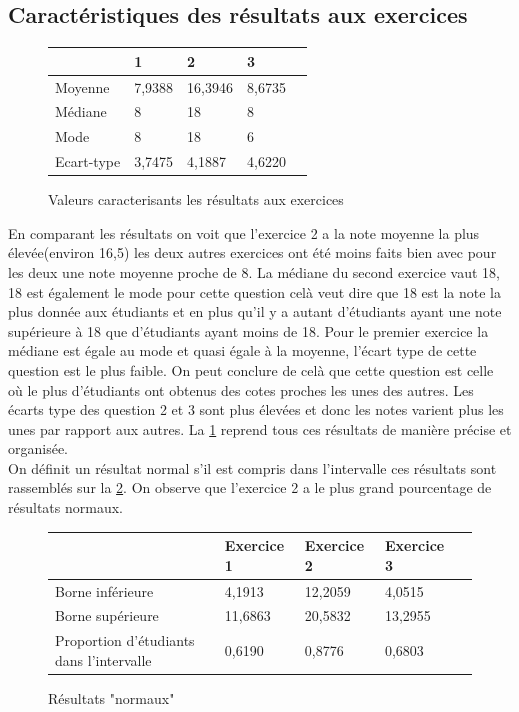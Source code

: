 \documentclass[a4paper, 11pt]{article}
\begin{document}
 	\subsection{Caractéristiques des résultats aux exercices}
 	\begin{figure}[H]
 	\begin{center}
   			\begin{tabular}{|l|l|l|l|l|}
				\hline
				 \backslashbox{Valeurs}{Question} & 1 & 2 & 3 \\
				\hline
				Moyenne & 7,9388  &  16,3946  &  8,6735  \\
  				Médiane & 8  &  18  &  8  \\
  				Mode & 8  &  18  &  6  \\
   				Ecart-type & 3,7475  &  4,1887  &  4,6220  \\
				\hline
			\end{tabular}
			\caption{Valeurs caracterisants les résultats aux exercices} \label{Q1B}
		\end{center}
		\end{figure}
En comparant les résultats on voit que l'exercice 2 a la note moyenne la plus élevée(environ 16,5) les deux autres exercices ont été  moins faits bien avec pour les deux une note moyenne proche de 8. La médiane du second exercice vaut 18, 18 est également le mode pour cette question celà veut dire que 18 est la note la plus donnée aux étudiants et en plus qu'il y a autant d'étudiants ayant une note supérieure à 18 que d'étudiants ayant moins de 18. Pour le premier exercice la médiane est égale au mode et quasi égale à la moyenne, l'écart type de cette question est le plus faible. On peut conclure de celà que cette question est celle où le plus d'étudiants ont obtenus des cotes proches les unes des autres. Les écarts type des question 2 et 3 sont plus élevées et donc les notes varient plus les unes par rapport aux autres. La  \ref{Q1B} reprend tous ces résultats de manière précise et organisée.\\
On définit un résultat normal s'il est compris dans l'intervalle  ces résultats sont rassemblés sur la  \ref{Q1B2}. On observe que l'exercice 2 a le plus grand pourcentage de résultats normaux.
\begin{figure}[H]
 	\begin{center}
   			\begin{tabular}{|l|l|l|l|l|}
				\hline
				  & Exercice 1 & Exercice 2 & Exercice 3 \\
				\hline
				Borne inférieure & 4,1913 &  12,2059  &  4,0515  \\
  				Borne supérieure & 11,6863 &  20,5832  & 13,2955  \\
  				Proportion d'étudiants dans l'intervalle & 0,6190   & 0,8776  &  0,6803\\
				\hline
			\end{tabular}
			\caption{Résultats "normaux"} \label{Q1B2}
		\end{center}
		\end{figure}
\end{document}
